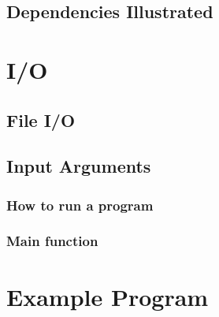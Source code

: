 \documentclass[titlepage]{article}
\begin{document}
\subsection{Dependencies Illustrated}
\section{I/O}
\subsection{File I/O}
\subsection{Input Arguments}
\subsubsection{How to run a program}
\subsubsection{Main function}
\section{Example Program}
\end{document}
